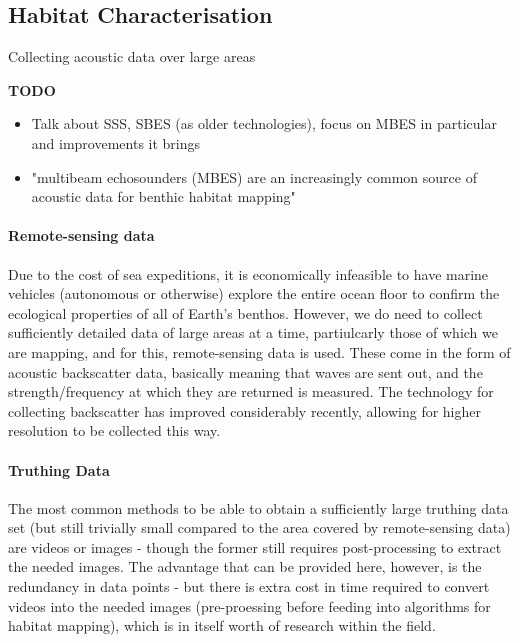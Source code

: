 \documentclass[12pt]{article}
\begin{document}
\begin{multicols}{2}
            \subsection{Habitat Characterisation}
            Collecting acoustic data over large areas 

            \textbf{TODO} 
            \begin{itemize}
                \item Talk about SSS, SBES (as older technologies), focus on MBES in particular and improvements it brings
                \item "multibeam echosounders (MBES) are an increasingly common source of acoustic data for benthic habitat mapping" \citep{calvert15}
            \end{itemize}

            \paragraph{Remote-sensing data}
            Due to the cost of sea expeditions, it is economically infeasible to have marine vehicles (autonomous or otherwise) explore the entire ocean floor to confirm the ecological properties of all of Earth's benthos. However, we do need to collect sufficiently detailed data of large areas at a time, partiulcarly those of which we are mapping, and for this, remote-sensing data is used. These come in the form of acoustic backscatter data, basically meaning that waves are sent out, and the strength/frequency at which they are returned is measured. The technology for collecting backscatter has improved considerably recently, allowing for higher resolution to be collected this way.

            \paragraph{Truthing Data}
            The most common methods to be able to obtain a sufficiently large truthing data set (but still trivially small compared to the area covered by remote-sensing data) are videos or images - though the former still requires post-processing to extract the needed images. The advantage that can be provided here, however, is the redundancy in data points \citep{rattray14}  - but there is extra cost in time required to convert videos into the needed images (pre-proessing before feeding into algorithms for habitat mapping), which is in itself worth of research within the field.\citep{lucieer13}


\end{multicols}
\end{document}
